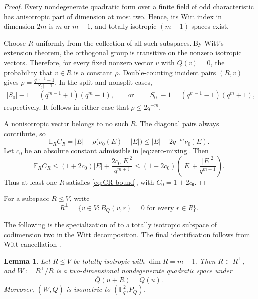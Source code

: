 \documentclass[11pt]{article}
\newtheorem{lemma}[theorem]{Lemma}
\newcommand{\F}{\mathbb F}
\newcommand{\abs}[1]{\left\lvert #1\right\rvert}
\begin{document}
\begin{proof} 
Every nondegenerate quadratic form over a finite field of odd characteristic has anisotropic part of dimension at most two.  Hence, its Witt index in dimension $2m$ is $m$ or $m-1$, and totally isotropic
$(m-1)$-spaces exist.

Choose $R$ uniformly from the collection of all such subspaces.  By
Witt's extension theorem, the orthogonal group is transitive on the
nonzero isotropic vectors. Therefore, for every fixed nonzero vector $v$ with
$Q(v)=0$, the probability that $v\in R$ is a constant $\rho$. Double-counting incident pairs $(R,v)$ gives $\rho=\frac{q^{m-1}-1}{\abs{S_0}-1}$. 
In the split and nonsplit cases, 
\begin{align*}
|S_0|-1=(q^{m-1}+1)(q^m-1),\qquad \text{or}\qquad  |S_0|-1=(q^{m-1}-1)(q^m+1),
\end{align*}
respectively. It follows in either case that $\rho\le2q^{-m}$.

A nonisotropic vector belongs to no such $R$. The diagonal pairs always contribute, so
\[
\mathbb E_R C_R =|E|+\rho\bigl(\nu_0(E)-|E|\bigr) \le |E|+2q^{-m}\nu_0(E).
\]
Let $c_0$ be an absolute constant admissible in
\eqref{eq:zero-mixing}.  Then
\[
 \mathbb E_R C_R
 \le (1+2c_0)|E|+\frac{2c_0|E|^2}{q^{m+1}}
 \le (1+2c_0)
 \left(|E|+\frac{|E|^2}{q^{m+1}}\right).
\]
Thus at least one $R$ satisfies \eqref{eq:CR-bound}, with
$C_0=1+2c_0$.
\end{proof}

For a subspace $R\le V$, write
\[
 R^\perp=\{v\in V:B_Q(v,r)=0\text{ for every }r\in R\}.
\]

The following is the specialization of \cite[Lemma~8.10]{ElmanKarpenkoMerkurjev} to a totally isotropic subspace of codimension two in the Witt decomposition. The final identification follows from Witt cancellation \cite[Theorem~8.4]{ElmanKarpenkoMerkurjev}.

\begin{lemma}
\label{lem:residual-quotient}
Let $R\le V$ be totally isotropic with $\dim R=m-1$.  Then $R\subset R^\perp$, and $W:=R^\perp/R$ is a two-dimensional nondegenerate quadratic space under
\begin{equation} \label{eq:quotient-form}
\overline Q(u+R)=Q(u).
\end{equation}
Moreover, $(W,\overline Q)$ is isometric to
$(\F_q^2,P_Q)$.
\end{lemma}

\end{document}

